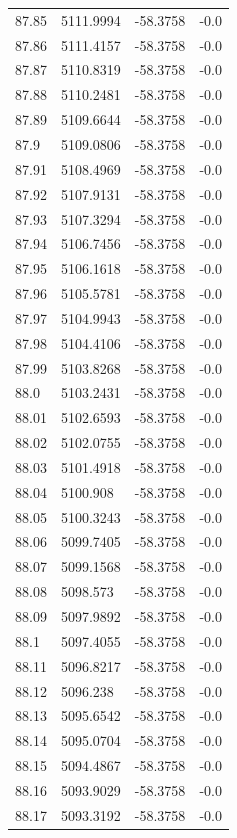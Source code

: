 \begin{table}[H]
\begin{tabular}{llll}
87.85 & 5111.9994 & -58.3758 & -0.0 \\
87.86 & 5111.4157 & -58.3758 & -0.0 \\
87.87 & 5110.8319 & -58.3758 & -0.0 \\
87.88 & 5110.2481 & -58.3758 & -0.0 \\
87.89 & 5109.6644 & -58.3758 & -0.0 \\
87.9 & 5109.0806 & -58.3758 & -0.0 \\
87.91 & 5108.4969 & -58.3758 & -0.0 \\
87.92 & 5107.9131 & -58.3758 & -0.0 \\
87.93 & 5107.3294 & -58.3758 & -0.0 \\
87.94 & 5106.7456 & -58.3758 & -0.0 \\
87.95 & 5106.1618 & -58.3758 & -0.0 \\
87.96 & 5105.5781 & -58.3758 & -0.0 \\
87.97 & 5104.9943 & -58.3758 & -0.0 \\
87.98 & 5104.4106 & -58.3758 & -0.0 \\
87.99 & 5103.8268 & -58.3758 & -0.0 \\
88.0 & 5103.2431 & -58.3758 & -0.0 \\
88.01 & 5102.6593 & -58.3758 & -0.0 \\
88.02 & 5102.0755 & -58.3758 & -0.0 \\
88.03 & 5101.4918 & -58.3758 & -0.0 \\
88.04 & 5100.908 & -58.3758 & -0.0 \\
88.05 & 5100.3243 & -58.3758 & -0.0 \\
88.06 & 5099.7405 & -58.3758 & -0.0 \\
88.07 & 5099.1568 & -58.3758 & -0.0 \\
88.08 & 5098.573 & -58.3758 & -0.0 \\
88.09 & 5097.9892 & -58.3758 & -0.0 \\
88.1 & 5097.4055 & -58.3758 & -0.0 \\
88.11 & 5096.8217 & -58.3758 & -0.0 \\
88.12 & 5096.238 & -58.3758 & -0.0 \\
88.13 & 5095.6542 & -58.3758 & -0.0 \\
88.14 & 5095.0704 & -58.3758 & -0.0 \\
88.15 & 5094.4867 & -58.3758 & -0.0 \\
88.16 & 5093.9029 & -58.3758 & -0.0 \\
88.17 & 5093.3192 & -58.3758 & -0.0 \\

\end{tabular}
\end{table}
